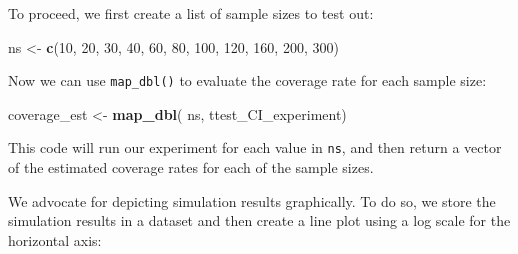 \documentclass[
]{book}
\newenvironment{Shaded}{\begin{snugshade}}{\end{snugshade}}
\newcommand{\DecValTok}[1]{\textcolor[rgb]{0.00,0.00,0.81}{#1}}
\newcommand{\FunctionTok}[1]{\textcolor[rgb]{0.13,0.29,0.53}{\textbf{#1}}}
\newcommand{\NormalTok}[1]{#1}
\newcommand{\OtherTok}[1]{\textcolor[rgb]{0.56,0.35,0.01}{#1}}
\begin{document}
To proceed, we first create a list of sample sizes to test out:

\begin{Shaded}
\begin{Highlighting}[]
\NormalTok{ns }\OtherTok{\textless{}{-}} \FunctionTok{c}\NormalTok{(}\DecValTok{10}\NormalTok{, }\DecValTok{20}\NormalTok{, }\DecValTok{30}\NormalTok{, }\DecValTok{40}\NormalTok{, }\DecValTok{60}\NormalTok{, }\DecValTok{80}\NormalTok{, }\DecValTok{100}\NormalTok{, }\DecValTok{120}\NormalTok{, }\DecValTok{160}\NormalTok{, }\DecValTok{200}\NormalTok{, }\DecValTok{300}\NormalTok{)}
\end{Highlighting}
\end{Shaded}

Now we can use \texttt{map\_dbl()} to evaluate the coverage rate for each sample size:

\begin{Shaded}
\begin{Highlighting}[]
\NormalTok{coverage\_est }\OtherTok{\textless{}{-}} \FunctionTok{map\_dbl}\NormalTok{( ns, ttest\_CI\_experiment)}
\end{Highlighting}
\end{Shaded}

This code will run our experiment for each value in \texttt{ns}, and then return a vector of the estimated coverage rates for each of the sample sizes.

We advocate for depicting simulation results graphically.
To do so, we store the simulation results in a dataset and then create a line plot using a log scale for the horizontal axis:
\end{document}
